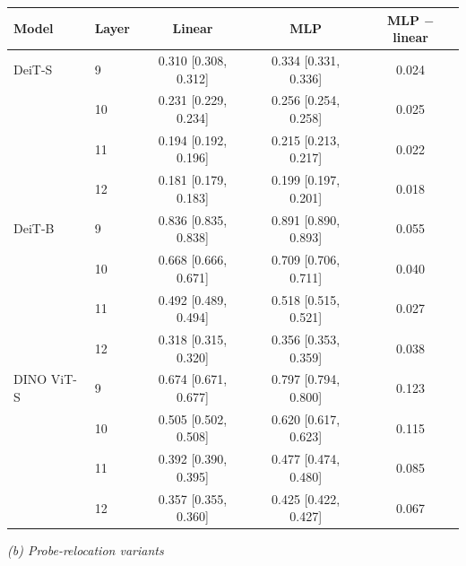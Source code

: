 \begin{tabular}{llccc}
\toprule
Model & Layer & Linear & MLP & MLP $-$ linear \\
\midrule
DeiT-S & 9 & 0.310 {\scriptsize [0.308, 0.312]} & 0.334 {\scriptsize [0.331, 0.336]} & 0.024 \\
 & 10 & 0.231 {\scriptsize [0.229, 0.234]} & 0.256 {\scriptsize [0.254, 0.258]} & 0.025 \\
 & 11 & 0.194 {\scriptsize [0.192, 0.196]} & 0.215 {\scriptsize [0.213, 0.217]} & 0.022 \\
 & 12 & 0.181 {\scriptsize [0.179, 0.183]} & 0.199 {\scriptsize [0.197, 0.201]} & 0.018 \\
\midrule
DeiT-B & 9 & 0.836 {\scriptsize [0.835, 0.838]} & 0.891 {\scriptsize [0.890, 0.893]} & 0.055 \\
 & 10 & 0.668 {\scriptsize [0.666, 0.671]} & 0.709 {\scriptsize [0.706, 0.711]} & 0.040 \\
 & 11 & 0.492 {\scriptsize [0.489, 0.494]} & 0.518 {\scriptsize [0.515, 0.521]} & 0.027 \\
 & 12 & 0.318 {\scriptsize [0.315, 0.320]} & 0.356 {\scriptsize [0.353, 0.359]} & 0.038 \\
\midrule
DINO ViT-S & 9 & 0.674 {\scriptsize [0.671, 0.677]} & 0.797 {\scriptsize [0.794, 0.800]} & 0.123 \\
 & 10 & 0.505 {\scriptsize [0.502, 0.508]} & 0.620 {\scriptsize [0.617, 0.623]} & 0.115 \\
 & 11 & 0.392 {\scriptsize [0.390, 0.395]} & 0.477 {\scriptsize [0.474, 0.480]} & 0.085 \\
 & 12 & 0.357 {\scriptsize [0.355, 0.360]} & 0.425 {\scriptsize [0.422, 0.427]} & 0.067 \\
\bottomrule
\end{tabular}
\par\medskip\textit{(b) Probe-relocation variants}\par\smallskip
